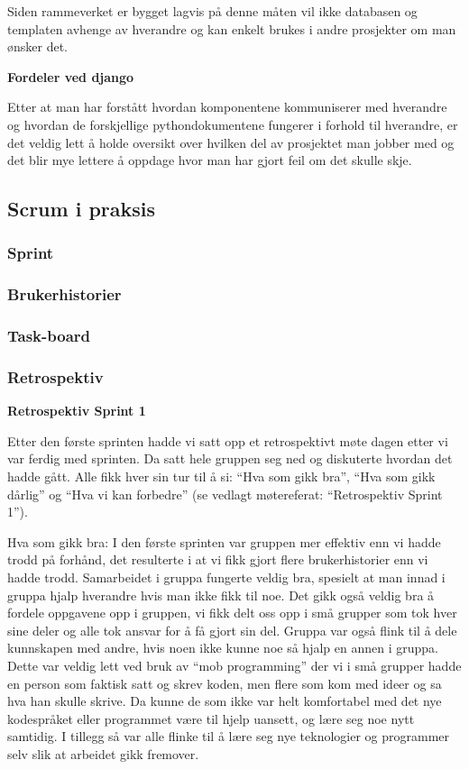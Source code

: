\documentclass[12pt,a4paper,norsk]{article}
\begin{document}
Siden rammeverket er bygget lagvis på denne måten vil ikke databasen og templaten avhenge av hverandre og kan enkelt brukes i andre prosjekter om man ønsker det. 

\bigskip \noindent \textbf{Fordeler ved django}
\par Etter at man har forstått hvordan komponentene kommuniserer med hverandre og hvordan de forskjellige pythondokumentene fungerer i forhold til hverandre, er det veldig lett å holde oversikt over hvilken del av prosjektet man jobber med og det blir mye lettere å oppdage hvor man har gjort feil om det skulle skje.

	\subsection{Scrum i praksis}
	\subsubsection{Sprint}
	\subsubsection{Brukerhistorier}
	\subsubsection{Task-board}
	\subsubsection{Retrospektiv}
	
\bigskip \noindent \textbf{Retrospektiv Sprint 1}
\par Etter den første sprinten hadde vi satt opp et retrospektivt møte dagen etter vi var ferdig med sprinten. Da satt hele gruppen seg ned og diskuterte hvordan det hadde gått. Alle fikk hver sin tur til å si: “Hva som gikk bra”, “Hva som gikk dårlig” og “Hva vi kan forbedre” (se vedlagt møtereferat: “Retrospektiv Sprint 1”).
 
Hva som gikk bra:
I den første sprinten var gruppen mer effektiv enn vi hadde trodd på forhånd, det resulterte i at vi fikk gjort flere brukerhistorier enn vi hadde trodd. Samarbeidet i gruppa fungerte veldig bra, spesielt at man innad i gruppa hjalp hverandre hvis man ikke fikk til noe. Det gikk også veldig bra å fordele oppgavene opp i gruppen, vi fikk delt oss opp i små grupper som tok hver sine deler og alle tok ansvar for å få gjort sin del. Gruppa var også flink til å dele kunnskapen med andre, hvis noen ikke kunne noe så hjalp en annen i gruppa. Dette var veldig lett ved bruk av “mob programming” der vi i små grupper hadde en person som faktisk satt og skrev koden, men flere som kom med ideer og sa hva han skulle skrive. Da kunne de som ikke var helt komfortabel med det nye kodespråket eller programmet være til hjelp uansett, og lære seg noe nytt samtidig. I tillegg så var alle flinke til å lære seg nye teknologier og programmer selv slik at arbeidet gikk fremover. 
\end{document}
